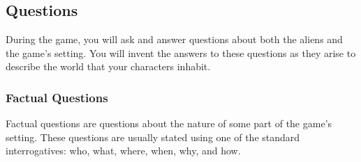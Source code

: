 \documentclass[a6paper, 11pt, parskip=half, DIV=15]{scrartcl}
\begin{document}
\subsection*{Questions}
During the game, you will ask and answer questions about both the aliens and the game's setting.
You will invent the answers to these questions as they arise to describe the world that your characters inhabit.

\newpage
\enlargethispage{1.75\baselineskip}


\subsubsection*{Factual Questions}

Factual questions are questions about the nature of some part of the game's setting.
These questions are usually stated using one of the standard interrogatives: who, what, where, when, why, and how.

\vfill

\begin{center}
\end{center}
\end{document}
